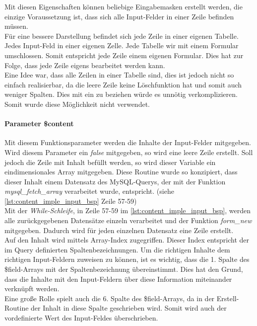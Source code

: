 Mit diesen Eigenschaften können beliebige Eingabemasken erstellt werden, die einzige Voraussetzung ist, dass sich alle Input-Felder in einer Zeile  befinden müssen.\\
Für eine bessere Darstellung befindet sich jede Zeile in einer eigenen Tabelle. Jedes Input-Feld in einer eigenen Zelle. Jede Tabelle wir mit einem Formular umschlossen. Somit entspricht jede Zeile einem eigenen Formular. Dies hat zur Folge, dass jede Zeile eigens bearbeitet werden kann.\\
Eine Idee war, dass alle Zeilen in einer Tabelle sind, dies ist jedoch nicht so einfach realisierbar, da die leere Zeile keine Löschfunktion hat und somit auch weniger Spalten. Dies mit ein zu beziehen würde es unnötig verkomplizieren. Somit wurde diese Möglichkeit nicht verwendet.
\paragraph{Parameter \$content}
Mit diesem Funktionsparameter werden die Inhalte der Input-Felder mitgegeben. Wird diesem Parameter ein \textit{false} mitgegeben, so wird eine leere Zeile erstellt. Soll jedoch die Zeile mit Inhalt befüllt werden, so wird dieser Variable ein eindimensionales Array mitgegeben. Diese Routine wurde so konzipiert, dass dieser Inhalt einem Datensatz des MySQL-Querys, der mit der Funktion \textit{mysql\_fetch\_array} verarbeitet wurde, entspricht. (siehe \autoref{lst:content_imple_input_bsp} Zeile 57-59)\\
Mit der \textit{While-Schleife}, in Zeile 57-59 im \autoref{lst:content_imple_input_bsp}, werden alle zurückgegebenen Datensätze einzeln verarbeitet und der Funktion \textit{form\_new} mitgegeben. Dadurch wird für jeden einzelnen Datensatz eine Zeile erstellt.\\
Auf den Inhalt wird mittels Array-Index zugegriffen. Dieser Index entspricht der im Query definierten Spaltenbezeichnungen. Um die richtigen Inhalte dem richtigen Input-Feldern zuweisen zu können, ist es wichtig, dass die 1. Spalte des \$field-Arrays mit der Spaltenbezeichnung übereinstimmt. Dies hat den Grund, dass die Inhalte mit den Input-Feldern über diese Information miteinander verknüpft werden.\\
Eine große Rolle spielt auch die 6. Spalte des \$field-Arrays, da in der Erstell-Routine der Inhalt in diese Spalte geschrieben wird. Somit wird auch der vordefinierte Wert des Input-Feldes überschrieben.\\



